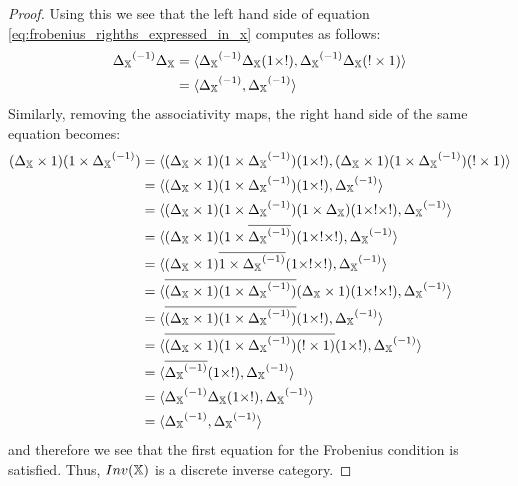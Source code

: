 \begin{proof}
  Using this we see that the left hand side of equation \vref{eq:frobenius_righths_expressed_in_x}
  computes as follows:
  \begin{align*}
    {\Delta_{\ensuremath{\mathbb{X}}}}^{(-1)} \Delta_{\mathbb{X}}
      & = \langle{\Delta_{\ensuremath{\mathbb{X}}}}^{(-1)} \Delta_{\mathbb{X}}(1\times !), {\Delta_{\mathbb{X}}}^{(-1)} \Delta_{\mathbb{X}} (! \times 1)\rangle\\
    &= \langle{\Delta_{\ensuremath{\mathbb{X}}}}^{(-1)}, {\Delta_{\mathbb{X}}}^{(-1)} \rangle
  \end{align*}
  Similarly, removing the associativity maps, the right hand side of the same equation becomes:
  \begin{align*}
    (\Delta_{\X} \times 1) (1\times\inv{\Delta_{\X}}) &
      = \<(\Delta_{\X} \times 1) (1\times\inv{\Delta_{\X}}) (1\times !),
      (\Delta_{\X} \times 1) (1\times\inv{\Delta_{\X}}) (! \times 1 )\> \\
    &= \<(\Delta_{\X} \times 1) (1\times\inv{\Delta_{\X}}) (1\times ! ), \inv{\Delta_{\X}}\> \\
    &= \<(\Delta_{\X} \times 1) (1\times\inv{\Delta_{\X}}) (1 \times \Delta_{\X})(1\times !\times !), \inv{\Delta_{\X}}\> \\
    &= \<(\Delta_{\X} \times 1) (1\times\rst{\inv{\Delta_{\X}}}) (1\times !\times !), \inv{\Delta_{\X}}\> \\
    &= \<(\Delta_{\X} \times 1) \rst{1\times\inv{\Delta_{\X}}} (1\times !\times !), \inv{\Delta_{\X}}\> \\
    &= \<\rst{(\Delta_{\X} \times 1) (1\times\inv{\Delta_{\X}})}
      (\Delta_{\X} \times 1)(1\times !\times !), \inv{\Delta_{\X}}\> \\ %
    &= \<\rst{(\Delta_{\X} \times 1) (1\times\inv{\Delta_{\X}})} (1\times !), \inv{\Delta_{\X}}\> \\
      &= \<\rst{(\Delta_{\X} \times 1) (1\times\inv{\Delta_{\X}})(! \times 1)} (1\times !),
      \inv{\Delta_{\X}}\> \\ %
    &= \<\rst{\inv{\Delta_{\X}}} (1\times !), \inv{\Delta_{\X}}\> \\
    &= \<\inv{\Delta_{\X}}\Delta_{\X}(1\times !), \inv{\Delta_{\X}}\> \\
    &= \<\inv{\Delta_{\X}}, \inv{\Delta_{\X}}\>
  \end{align*}
  and therefore we see that the first equation for the Frobenius condition is satisfied. Thus,
  $Inv(\mathbb{X})$ is a discrete inverse category.
\end{proof}

